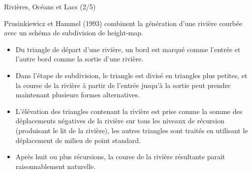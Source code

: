 \documentclass{beamer}
\begin{document}
\begin{frame}{Rivières, Océans et Lacs (2/5)}

Prusinkiewicz et Hammel (1993) combinent la génération d'une rivière courbée avec un schéma de subdivision de height-map.

\begin{itemize}
	\item<2-> Du triangle de départ d'une rivière, un bord est marqué comme l'entrée et l'autre bord comme la sortie d'une rivière.
	
	\item<3-> Dans l'étape de subdivision, le triangle est divisé en triangles plus petites, et la course de la rivière à partir de l'entrée jusqu'à la sortie peut prendre maintenant plusieurs formes alternatives.
	
	\item<4-> L'élévation des triangles contenant la rivière est prise comme la somme des déplacements négatives de la rivière sur tous les niveaux de récursion (produisant le lit de la rivière), les autres triangles sont traités en utilisant le déplacement de milieu de point standard.
	
	\item<5-> Après huit ou plus récursions, la course de la rivière résultante parait raisonnablement naturelle.
\end{itemize}

\end{frame}
\end{document}
